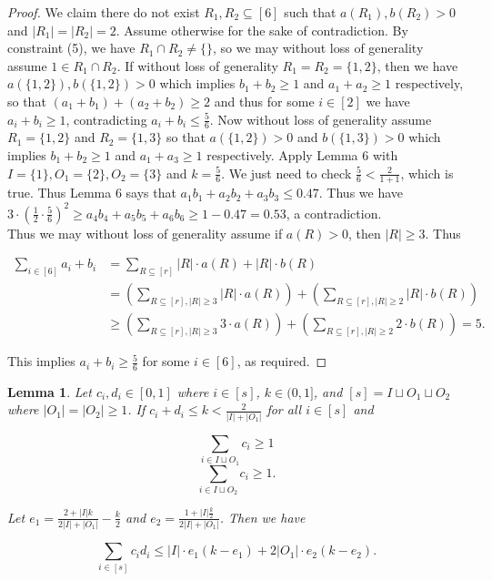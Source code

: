 \documentclass{article}
\newtheorem{lemma}{Lemma}
\begin{document}
\begin{proof}
We claim there do not exist $R_1,R_2 \subseteq [6]$ such that $a(R_1), b(R_2) > 0$ and $|R_1|=|R_2| = 2$. Assume otherwise for the sake of contradiction. By constraint (5), we have $R_1 \cap R_2 \neq \{\}$, so we may without loss of generality assume $1 \in R_1 \cap R_2$. If without loss of generality $R_1 = R_2 = \{1,2\}$, then we have $a(\{1,2\}),b(\{1,2\}) > 0$ which implies $b_1+b_2 \geq 1$ and $a_1+a_2 \geq 1$ respectively, so that $(a_1+b_1) + (a_2+b_2) \geq 2$ and thus for some $i \in [2]$ we have $a_i+b_i \geq 1$, contradicting $a_i+b_i \leq \frac{5}{6}$. Now without loss of generality assume $R_1 = \{1,2\}$ and $R_2 = \{1,3\}$ so that $a(\{1,2\}) > 0$ and $b(\{1,3\}) > 0$ which implies $b_1 + b_2 \geq 1$ and $a_1 + a_3 \geq 1$ respectively. Apply Lemma 6 with $I = \{1\}, O_1 = \{2\}, O_2 = \{3\}$ and $k = \frac{5}{6}$. We just need to check $\frac{5}{6} < \frac{2}{1+1}$, which is true. Thus Lemma 6 says that $a_1b_1 + a_2b_2 + a_3b_3 \leq 0.47$. Thus we have $ 3 \cdot (\frac{1}{2} \cdot \frac{5}{6})^2 \geq a_4b_4 + a_5b_5 + a_6b_6 \geq 1-0.47 = 0.53$, a contradiction. \\

Thus we may without loss of generality assume if $a(R) > 0$, then $|R| \geq 3$. Thus

\begin{align*}
\sum_{i \in [6]} a_i + b_i &= \sum_{R \subseteq [r]} |R| \cdot a(R) + |R| \cdot b(R) \\
&= \left( \sum_{R \subseteq [r], |R| \geq 3} |R| \cdot a(R) \right) + \left( \sum_{R \subseteq [r], |R| \geq 2} |R| \cdot b(R) \right) \\
&\geq \left( \sum_{R \subseteq [r], |R| \geq 3} 3 \cdot a(R) \right) + \left( \sum_{R \subseteq [r], |R| \geq 2} 2 \cdot b(R) \right) = 5.
\end{align*}

\noindent
This implies $a_i + b_i \geq \frac{5}{6}$ for some $i \in [6]$, as required.
\end{proof}

\begin{lemma}
Let $c_i, d_i \in [0,1]$ where $i \in [s]$, $k \in (0,1]$, and $[s] = I \sqcup O_1 \sqcup O_2$ where $|O_1| = |O_2| \geq 1$. If $c_i + d_i \leq k < \frac{2}{|I| + |O_1|}$ for all $i \in [s]$ and 

$$\sum_{i \in I \sqcup O_1} c_i \geq 1$$ 
$$\sum_{i \in I \sqcup O_2} c_i \geq 1.$$

\noindent
Let $e_1 = \frac{2+|I|k}{2|I|+|O_1|} - \frac{k}{2}$ and $e_2 = \frac{1+|I|\frac{k}{2}}{2|I| + |O_1|}$. Then we have 

$$\sum_{i \in [s]} c_id_i \leq |I| \cdot e_1(k-e_1) + 2|O_1| \cdot e_2(k - e_2).$$
\end{lemma}
\end{document}
